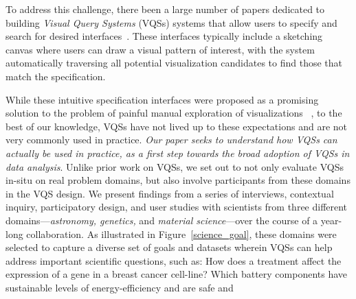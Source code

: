  To address this  challenge, there  been a large number of papers dedicated to building \emph{Visual Query Systems} (VQSs) systems that allow users to specify and search for desired  interfaces~\cite{mohebbi2011google,Hochheiser2004,wattenberg2001sketching,Siddiqui2017VLDB,ryall2005querylines,correll2016semantics,Mannino2018,Eichmann2015,Holz2009}. %
 These interfaces typically include a sketching canvas where users can draw a visual pattern of interest, with the system automatically traversing all potential visualization candidates to find those that match the specification. 
 \par While these intuitive specification interfaces were proposed as a promising solution to the problem of painful manual exploration of visualizations ~\cite{ryall2005querylines,wattenberg2001sketching}, to the best of our knowledge, VQSs have not lived up to these expectations and are not very commonly used in practice.  {\em Our paper seeks to understand how VQSs can actually be used in practice, as a first step towards the broad adoption of VQSs in data analysis}. Unlike prior work on VQSs, we set out to not only evaluate VQSs in-situ on real problem domains, but also involve participants from these domains in the VQS design. We present findings from a series of interviews, contextual inquiry, participatory design, and user studies with scientists from three different domains---{\em astronomy, genetics,} and {\em material science}---over the course of
 a year-long collaboration.  As illustrated in Figure~\ref{science_goal}, these domains were selected to capture a diverse set of goals and datasets wherein VQSs can help address important scientific questions, such as: How does a treatment affect the expression of a gene in a breast cancer cell-line? Which battery components have sustainable levels of energy-efficiency and are safe and
